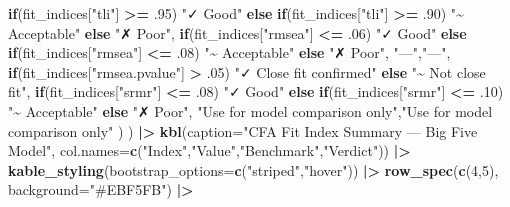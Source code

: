 \documentclass[
]{article}
\newenvironment{Shaded}{\begin{snugshade}}{\end{snugshade}}
\newcommand{\AttributeTok}[1]{\textcolor[rgb]{0.13,0.29,0.53}{#1}}
\newcommand{\ControlFlowTok}[1]{\textcolor[rgb]{0.13,0.29,0.53}{\textbf{#1}}}
\newcommand{\DecValTok}[1]{\textcolor[rgb]{0.00,0.00,0.81}{#1}}
\newcommand{\FunctionTok}[1]{\textcolor[rgb]{0.13,0.29,0.53}{\textbf{#1}}}
\newcommand{\NormalTok}[1]{#1}
\newcommand{\SpecialCharTok}[1]{\textcolor[rgb]{0.81,0.36,0.00}{\textbf{#1}}}
\newcommand{\StringTok}[1]{\textcolor[rgb]{0.31,0.60,0.02}{#1}}
\begin{document}
\begin{Shaded}
\begin{Highlighting}[]
    \ControlFlowTok{if}\NormalTok{(fit\_indices[}\StringTok{"tli"}\NormalTok{] }\SpecialCharTok{\textgreater{}=}\NormalTok{ .}\DecValTok{95}\NormalTok{) }\StringTok{"✓ Good"} \ControlFlowTok{else} \ControlFlowTok{if}\NormalTok{(fit\_indices[}\StringTok{"tli"}\NormalTok{] }\SpecialCharTok{\textgreater{}=}\NormalTok{ .}\DecValTok{90}\NormalTok{) }\StringTok{"\textasciitilde{} Acceptable"} \ControlFlowTok{else} \StringTok{"✗ Poor"}\NormalTok{,}
    \ControlFlowTok{if}\NormalTok{(fit\_indices[}\StringTok{"rmsea"}\NormalTok{] }\SpecialCharTok{\textless{}=}\NormalTok{ .}\DecValTok{06}\NormalTok{) }\StringTok{"✓ Good"} \ControlFlowTok{else} \ControlFlowTok{if}\NormalTok{(fit\_indices[}\StringTok{"rmsea"}\NormalTok{] }\SpecialCharTok{\textless{}=}\NormalTok{ .}\DecValTok{08}\NormalTok{) }\StringTok{"\textasciitilde{} Acceptable"} \ControlFlowTok{else} \StringTok{"✗ Poor"}\NormalTok{,}
    \StringTok{"—"}\NormalTok{,}\StringTok{"—"}\NormalTok{,}
    \ControlFlowTok{if}\NormalTok{(fit\_indices[}\StringTok{"rmsea.pvalue"}\NormalTok{] }\SpecialCharTok{\textgreater{}}\NormalTok{ .}\DecValTok{05}\NormalTok{) }\StringTok{"✓ Close fit confirmed"} \ControlFlowTok{else} \StringTok{"\textasciitilde{} Not close fit"}\NormalTok{,}
    \ControlFlowTok{if}\NormalTok{(fit\_indices[}\StringTok{"srmr"}\NormalTok{] }\SpecialCharTok{\textless{}=}\NormalTok{ .}\DecValTok{08}\NormalTok{) }\StringTok{"✓ Good"} \ControlFlowTok{else} \ControlFlowTok{if}\NormalTok{(fit\_indices[}\StringTok{"srmr"}\NormalTok{] }\SpecialCharTok{\textless{}=}\NormalTok{ .}\DecValTok{10}\NormalTok{) }\StringTok{"\textasciitilde{} Acceptable"} \ControlFlowTok{else} \StringTok{"✗ Poor"}\NormalTok{,}
    \StringTok{"Use for model comparison only"}\NormalTok{,}\StringTok{"Use for model comparison only"}
\NormalTok{  )}
\NormalTok{) }\SpecialCharTok{|\textgreater{}}
  \FunctionTok{kbl}\NormalTok{(}\AttributeTok{caption=}\StringTok{"CFA Fit Index Summary — Big Five Model"}\NormalTok{,}
      \AttributeTok{col.names=}\FunctionTok{c}\NormalTok{(}\StringTok{"Index"}\NormalTok{,}\StringTok{"Value"}\NormalTok{,}\StringTok{"Benchmark"}\NormalTok{,}\StringTok{"Verdict"}\NormalTok{)) }\SpecialCharTok{|\textgreater{}}
  \FunctionTok{kable\_styling}\NormalTok{(}\AttributeTok{bootstrap\_options=}\FunctionTok{c}\NormalTok{(}\StringTok{"striped"}\NormalTok{,}\StringTok{"hover"}\NormalTok{)) }\SpecialCharTok{|\textgreater{}}
  \FunctionTok{row\_spec}\NormalTok{(}\FunctionTok{c}\NormalTok{(}\DecValTok{4}\NormalTok{,}\DecValTok{5}\NormalTok{), }\AttributeTok{background=}\StringTok{"\#EBF5FB"}\NormalTok{) }\SpecialCharTok{|\textgreater{}}

\end{Highlighting}
\end{Shaded}
\end{document}
